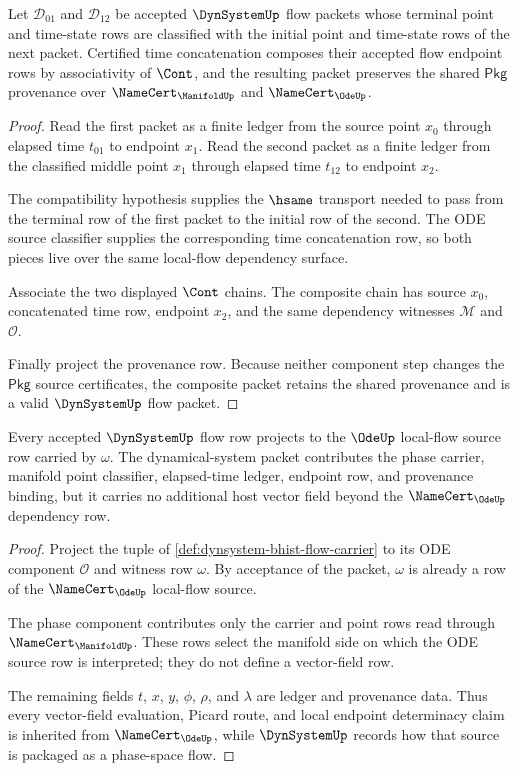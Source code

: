 \begin{theorem}
\label{thm:dynsystem-flow-composition-ledger}
Let $\mathcal{D}_{01}$ and $\mathcal{D}_{12}$ be accepted $\DynSystemUp$ flow packets whose terminal point and time-state rows are classified with the initial point and time-state rows of the next packet. Certified time concatenation composes their accepted flow endpoint rows by associativity of $\Cont$, and the resulting packet preserves the shared $\mathsf{Pkg}$ provenance over $\NameCert_{\ManifoldUp}$ and $\NameCert_{\OdeUp}$.
\end{theorem}
\begin{proof}
Read the first packet as a finite ledger from the source point $x_0$ through elapsed time $t_{01}$ to endpoint $x_1$. Read the second packet as a finite ledger from the classified middle point $x_1$ through elapsed time $t_{12}$ to endpoint $x_2$.

The compatibility hypothesis supplies the $\hsame$ transport needed to pass from the terminal row of the first packet to the initial row of the second. The ODE source classifier supplies the corresponding time concatenation row, so both pieces live over the same local-flow dependency surface.

Associate the two displayed $\Cont$ chains. The composite chain has source $x_0$, concatenated time row, endpoint $x_2$, and the same dependency witnesses $\mathcal{M}$ and $\mathcal{O}$.

Finally project the provenance row. Because neither component step changes the $\mathsf{Pkg}$ source certificates, the composite packet retains the shared provenance and is a valid $\DynSystemUp$ flow packet.
\end{proof}

\begin{theorem}
\label{thm:dynsystem-ode-source-ledger}
Every accepted $\DynSystemUp$ flow row projects to the $\OdeUp$ local-flow source row carried by $\omega$. The dynamical-system packet contributes the phase carrier, manifold point classifier, elapsed-time ledger, endpoint row, and provenance binding, but it carries no additional host vector field beyond the $\NameCert_{\OdeUp}$ dependency row.
\end{theorem}
\begin{proof}
Project the tuple of \autoref{def:dynsystem-bhist-flow-carrier} to its ODE component $\mathcal{O}$ and witness row $\omega$. By acceptance of the packet, $\omega$ is already a row of the $\NameCert_{\OdeUp}$ local-flow source.

The phase component contributes only the carrier and point rows read through $\NameCert_{\ManifoldUp}$. These rows select the manifold side on which the ODE source row is interpreted; they do not define a vector-field row.

The remaining fields $t$, $x$, $y$, $\phi$, $\rho$, and $\lambda$ are ledger and provenance data. Thus every vector-field evaluation, Picard route, and local endpoint determinacy claim is inherited from $\NameCert_{\OdeUp}$, while $\DynSystemUp$ records how that source is packaged as a phase-space flow.
\end{proof}

